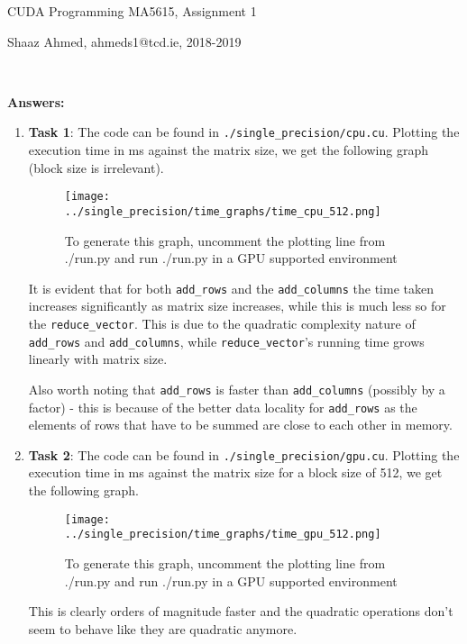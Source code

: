 \documentclass[fleqn, 11pt]{article}
\date{17/09/2018}
\begin{document}
{\Large CUDA Programming MA5615, Assignment 1}\par
{\small Shaaz Ahmed}, {\small ahmeds1@tcd.ie}, {\small 2018-2019} \par
{\ }\par

\textbf{Answers:} \par
\begin{enumerate}
 \item \textbf{Task 1}:  The code can be found in \texttt{./single\_precision/cpu.cu}. Plotting the execution time in ms against the matrix size, we get the following graph (block size is irrelevant).
\begin{figure}[h]
\texttt{[image: ../single\_precision/time\_graphs/time\_cpu\_512.png]}
\centering 
\caption*{{\tiny To generate this graph, uncomment the plotting line from ./run.py and run ./run.py in a GPU supported environment}}
\end{figure} 

It is evident that for both  \texttt{add\_rows} and the \texttt{add\_columns}  the time taken increases significantly as matrix size increases, while this is much less so for the \texttt{reduce\_vector}. This is due to the quadratic complexity nature of \texttt{add\_rows} and \texttt{add\_columns}, while \texttt{reduce\_vector}'s running time grows linearly with matrix size.

Also worth noting that \texttt{add\_rows} is faster than \texttt{add\_columns} (possibly by a factor) - this is because of the better data locality for \texttt{add\_rows} as the elements of rows that have to be summed are close to each other in memory.

 \item \textbf{Task 2}:  The code can be found in \texttt{./single\_precision/gpu.cu}. Plotting the execution time in ms against the matrix size for a block size of 512, we get the following graph.
 
\begin{figure}[h]
\texttt{[image: ../single\_precision/time\_graphs/time\_gpu\_512.png]}
\centering 
\caption*{{\tiny To generate this graph, uncomment the plotting line from ./run.py and run ./run.py in a GPU supported environment}}
\end{figure} 
\par

This is clearly orders of magnitude faster and the quadratic operations don't seem to behave like they are quadratic anymore.


\end{enumerate}
\end{document}
